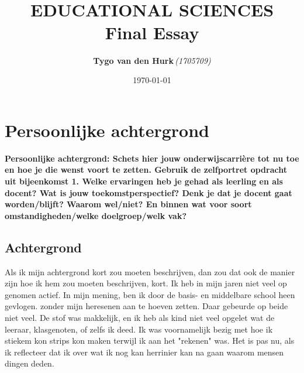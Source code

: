 \documentclass{article}
\title{ 
    \normalsize 
    \textsc{} \\
    [2.0cm]
    \HRule{1.5pt} \\
    \LARGE \textbf{
        \uppercase{Educational sciences}
        \HRule{2.0pt} \\ 
        [0.6cm] 
        \LARGE{Final Essay} 
        \vspace*{10\baselineskip}
    }
}
\date{\today}
\author{
    \textbf{Tygo van den Hurk}\,\orcidlink{0009-0003-4182-5076}\textit{(1705709)}
}
\begin{document}
   

    
    \maketitle
    \thispagestyle{empty}
    \newpage
    
    
    \renewcommand{\contentsname}{Inhoudsopgave}
    \tableofcontents
    \thispagestyle{empty}
    \newpage


    \section{Persoonlijke achtergrond}

        \textbf{Persoonlijke achtergrond: Schets hier jouw onderwijscarrière tot nu toe en hoe je die wenst voort te zetten. Gebruik de zelfportret opdracht uit bijeenkomst 1. Welke ervaringen heb je gehad als leerling en als docent? Wat is jouw toekomstperspectief? Denk je dat je docent gaat worden/blijft? Waarom wel/niet? En binnen wat voor soort omstandigheden/welke doelgroep/welk vak?}
        
        \subsection{Achtergrond}

            Als ik mijn achtergrond kort zou moeten beschrijven, dan zou dat ook de manier zijn hoe ik hem zou moeten beschrijven, kort. Ik heb in mijn jaren niet veel op genomen actief. In mijn mening, ben ik door de basis- en middelbare school heen gevlogen. zonder mijn heresenen aan te hoeven zetten. Daar gebeurde op beide niet veel. De stof was makkelijk, en ik heb als kind niet veel opgelet wat de leeraar, klasgenoten, of zelfs ik deed. Ik was voornamelijk bezig met hoe ik stiekem kon strips kon maken terwijl ik aan het "rekenen" was. Het is pas nu, als ik reflecteer dat ik over wat ik nog kan herrinier kan na gaan waarom mensen dingen deden.
\end{document}
